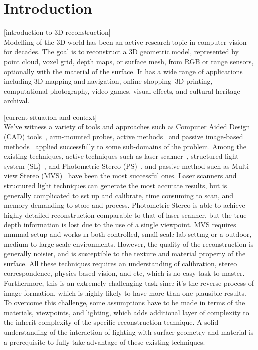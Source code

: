
\chapter{Introduction}
\label{ch:Introduction}
[introduction to 3D reconstruction]\\
Modelling of the 3D world has been an active research topic in computer vision for decades. The goal is to reconstruct a 3D geometric model, represented by point cloud, voxel grid, depth maps, or surface mesh, from RGB or range sensors, optionally with the material of the surface. It has a wide range of applications including 3D mapping and navigation, online shopping, 3D printing, computational photography, video games, visual effects, and cultural heritage archival.

[current situation and context]\\
We've witness a variety of tools and approaches such as Computer Aided Design (CAD) tools~\cite{CAD}, arm-mounted probes, active methods~\cite{bernardini2002building,levoy2000digital,Lidar,kinect} and passive image-based methods~\cite{kutulakos2000theory,furukawa2010accurate,faugeras2002variational,goesele2006multi} applied successfully to some sub-domains of the problem. Among the existing techniques, active techniques such as laser scanner~\cite{levoy2000digital}, structured light system (SL)~\cite{bernardini2002building}, and Photometric Stereo (PS)~\cite{woodham1980photometric}, and passive method such as Multi-view Stereo (MVS)~\cite{seitz2006comparison} have been the most successful ones. Laser scanners and structured light techniques can generate the most accurate results, but is generally complicated to set up and calibrate, time consuming to scan, and memory demanding to store and process. Photometric Stereo is able to achieve highly detailed reconstruction comparable to that of laser scanner, but the true depth information is lost due to the use of a single viewpoint. MVS requires minimal setup and works in both controlled, small scale lab setting or a outdoor, medium to large scale environments. However, the quality of the reconstruction is generally noisier, and is susceptible to the texture and material property of the surface. All these techniques requires an understanding of calibration, stereo correspondence, physics-based vision, and etc, which is no easy task to master. Furthermore, this is an extremely challenging task since it's the reverse process of image formation, which is highly likely to have more than one plausible results. To overcome this challenge, some assumptions have to be made in terms of the materials, viewpoints, and lighting, which adds additional layer of complexity to the inherit complexity of the specific reconstruction technique. A solid understanding of the interaction of lighting with surface geometry and material is a prerequisite to fully take advantage of these existing techniques.

